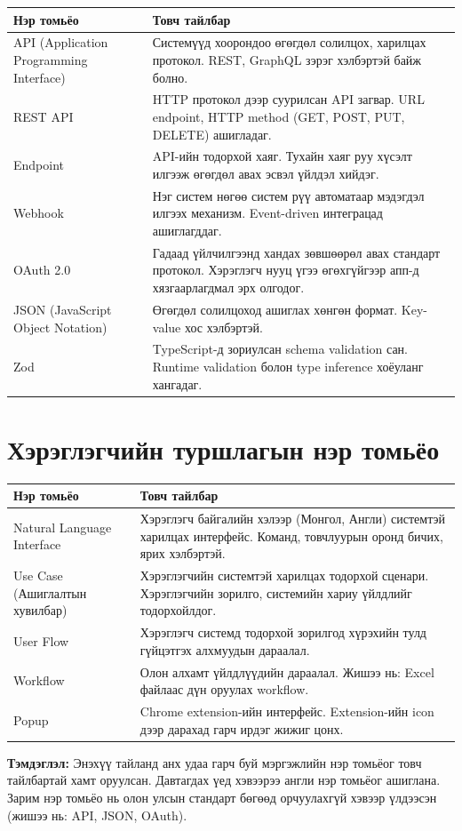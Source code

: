 \begin{table}[H]
  \centering
  \begin{tabularx}{\textwidth}{>{\raggedright\arraybackslash}p{4.5cm} X}
    \toprule
    Нэр томьёо & Товч тайлбар \\
    \midrule
    API (Application Programming Interface) & Системүүд хоорондоо өгөгдөл солилцох, харилцах протокол. REST, GraphQL зэрэг хэлбэртэй байж болно. \\
    \addlinespace
    REST API & HTTP протокол дээр суурилсан API загвар. URL endpoint, HTTP method (GET, POST, PUT, DELETE) ашигладаг. \\
    \addlinespace
    Endpoint & API-ийн тодорхой хаяг. Тухайн хаяг руу хүсэлт илгээж өгөгдөл авах эсвэл үйлдэл хийдэг. \\
    \addlinespace
    Webhook & Нэг систем нөгөө систем рүү автоматаар мэдэгдэл илгээх механизм. Event-driven интеграцад ашиглагддаг. \\
    \addlinespace
    OAuth 2.0 & Гадаад үйлчилгээнд хандах зөвшөөрөл авах стандарт протокол. Хэрэглэгч нууц үгээ өгөхгүйгээр апп-д хязгаарлагдмал эрх олгодог. \\
    \addlinespace
    JSON (JavaScript Object Notation) & Өгөгдөл солилцоход ашиглах хөнгөн формат. Key-value хос хэлбэртэй. \\
    \addlinespace
    Zod & TypeScript-д зориулсан schema validation сан. Runtime validation болон type inference хоёуланг хангадаг. \\
    \bottomrule
  \end{tabularx}
\end{table}

\section*{Хэрэглэгчийн туршлагын нэр томьёо}

\begin{table}[H]
  \centering
  \begin{tabularx}{\textwidth}{>{\raggedright\arraybackslash}p{4.5cm} X}
    \toprule
    Нэр томьёо & Товч тайлбар \\
    \midrule
    Natural Language Interface & Хэрэглэгч байгалийн хэлээр (Монгол, Англи) системтэй харилцах интерфейс. Команд, товчлуурын оронд бичих, ярих хэлбэртэй. \\
    \addlinespace
    Use Case (Ашиглалтын хувилбар) & Хэрэглэгчийн системтэй харилцах тодорхой сценари. Хэрэглэгчийн зорилго, системийн хариу үйлдлийг тодорхойлдог. \\
    \addlinespace
    User Flow & Хэрэглэгч системд тодорхой зорилгод хүрэхийн тулд гүйцэтгэх алхмуудын дараалал. \\
    \addlinespace
    Workflow & Олон алхамт үйлдлүүдийн дараалал. Жишээ нь: Excel файлаас дүн оруулах workflow. \\
    \addlinespace
    Popup & Chrome extension-ийн интерфейс. Extension-ийн icon дээр дарахад гарч ирдэг жижиг цонх. \\
    \bottomrule
  \end{tabularx}
\end{table}

\vspace{1cm}
\noindent\textbf{Тэмдэглэл:} Энэхүү тайланд анх удаа гарч буй мэргэжлийн нэр томьёог товч тайлбартай хамт оруулсан. Давтагдах үед хэвээрээ англи нэр томьёог ашиглана. Зарим нэр томьёо нь олон улсын стандарт бөгөөд орчуулахгүй хэвээр үлдээсэн (жишээ нь: API, JSON, OAuth).
